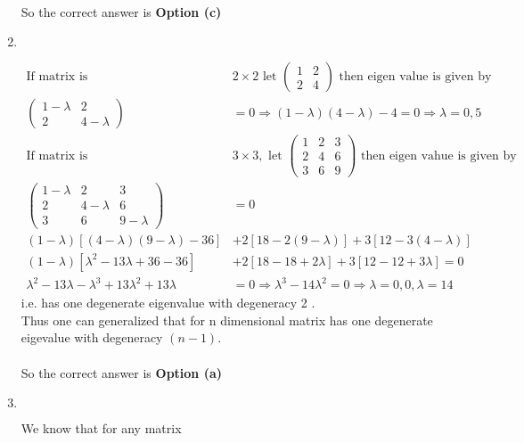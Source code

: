 \begin{enumerate}
\begin{answer}
\begin{align*}
	\end{align*}
		So the correct answer is \textbf{Option (c)}
\end{answer}
\item $\left. \right. $
\begin{answer}
	\begin{align*}
	\text{If matrix is }&2 \times 2\text{ let }\left(\begin{array}{ll}1 & 2 \\ 2 & 4\end{array}\right)\text{ then eigen value is given by }\\ \left(\begin{array}{cc}1-\lambda & 2 \\ 2 & 4-\lambda\end{array}\right)&=0 \Rightarrow(1-\lambda)(4-\lambda)-4=0 \Rightarrow \lambda=0,5\\
	\text{If matrix is }&3 \times 3,\text{ let }\left(\begin{array}{lll}1 & 2 & 3 \\ 2 & 4 & 6 \\ 3 & 6 & 9\end{array}\right)\text{ then eigen vahue is given by }\\
	\left(\begin{array}{ccc}1-\lambda & 2 & 3 \\ 2 & 4-\lambda & 6 \\ 3 & 6 & 9-\lambda\end{array}\right)&=0\\
	(1-\lambda)[(4-\lambda)(9-\lambda)-36]&+2[18-2(9-\lambda)]+3[12-3(4-\lambda)]\\
	(1-\lambda)\left[\lambda^{2}-13 \lambda+36-36\right]&+2[18-18+2 \lambda]+3[12-12+3 \lambda]=0\\
	\lambda^{2}-13 \lambda-\lambda^{3}+13 \lambda^{2}+13 \lambda&=0 \Rightarrow \lambda^{3}-14 \lambda^{2}=0 \Rightarrow \lambda=0,0, \lambda=14
	\end{align*}
	i.e. has one degenerate eigenvalue with degeneracy 2 .\\
	Thus one can generalized that for $\mathrm{n}$ dimensional matrix has one degenerate eigevalue with degeneracy $(n-1)$.\\\\
		So the correct answer is \textbf{Option (a)}
\end{answer}
\item $\left. \right. $
\begin{answer}
	We know that for any matrix\\

\end{answer}
\end{enumerate}
